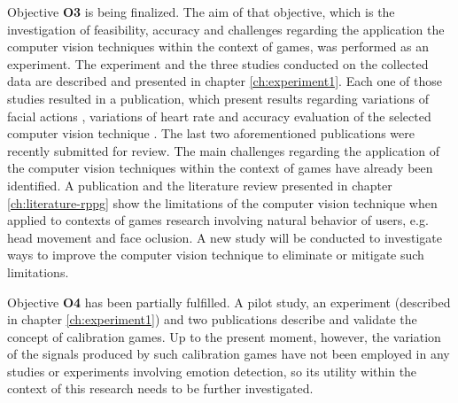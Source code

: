 Objective \textbf{O3} is being finalized. The aim of that objective, which is the investigation of feasibility, accuracy and challenges regarding the application the computer vision techniques within the context of games, was performed as an experiment. The experiment and the three studies conducted on the collected data are described and presented in chapter \ref{ch:experiment1}. Each one of those studies resulted in a publication, which present results regarding variations of facial actions \parencite{bevilacqua2016variations}, variations of heart rate \parencite{bevilacqua2017changes} and accuracy evaluation of the selected computer vision technique \parencite{bevilacqua2017accuracy}. The last two aforementioned publications were recently submitted for review. The main challenges regarding the application of the computer vision techniques within the context of games have already been identified. A publication \parencite{bevilacqua2017accuracy} and the literature review presented in chapter \ref{ch:literature-rppg} show the limitations of the computer vision technique when applied to contexts of games research involving natural behavior of users, e.g. head movement and face oclusion. A new study will be conducted to investigate ways to improve the computer vision technique to eliminate or mitigate such limitations.

Objective \textbf{O4} has been partially fulfilled. A pilot study, an experiment (described in chapter \ref{ch:experiment1}) and two publications \parencite{bevilacqua2016variations,bevilacqua2017changes} describe and validate the concept of calibration games. Up to the present moment, however, the variation of the signals produced by such calibration games have not been employed in any studies or experiments involving emotion detection, so its utility within the context of this research needs to be further investigated.
